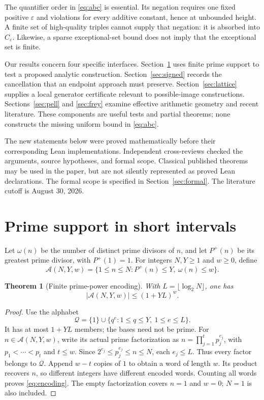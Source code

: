 \documentclass[11pt]{amsart}
\newtheorem{theorem}{Theorem}[section]
\theoremstyle{definition}
\theoremstyle{remark}
\newcommand{\eps}{\varepsilon}
\begin{document}
The quantifier order in \eqref{eq:abc} is essential. Its negation requires
one fixed positive $\eps$ and violations for every additive constant, hence
at unbounded height. A finite set of high-quality triples cannot supply that
negation: it is absorbed into $C_\eps$. Likewise, a sparse exceptional-set
bound does not imply that the exceptional set is finite.

Our results concern four specific interfaces. Section~\ref{sec:smooth}
uses finite prime support to test a proposed analytic construction.
Section~\ref{sec:signed} records the cancellation that an endpoint approach
must preserve. Section~\ref{sec:lattice} supplies a local generator
certificate relevant to possible-image constructions. Sections~\ref{sec:pell}
and \ref{sec:frey} examine effective arithmetic geometry and recent
literature. These components are useful tests and partial theorems; none
constructs the missing uniform bound in \eqref{eq:abc}.

The new statements below were proved mathematically before their
corresponding Lean implementations. Independent cross-reviews checked the
arguments, source hypotheses, and formal scope. Classical published
theorems may be used in the paper, but are not silently represented as
proved Lean declarations. The formal scope is specified in
Section~\ref{sec:formal}. The literature cutoff is August 30, 2026.

\section{Prime support in short intervals}\label{sec:smooth}

Let $\omega(n)$ be the number of distinct prime divisors of $n$, and let
$P^+(n)$ be its greatest prime divisor, with $P^+(1)=1$.
For integers $N,Y\ge1$ and $w\ge0$, define
\[
 \mathcal A(N,Y,w)=
 \{1\le n\le N:P^+(n)\le Y,\ \omega(n)\le w\}.
\]

\begin{theorem}[Finite prime-power encoding]\label{thm:encoding}
With $L=\lfloor\log_2N\rfloor$, one has
\begin{equation}\label{eq:encoding}
 |\mathcal A(N,Y,w)|\le(1+YL)^w.
\end{equation}
\end{theorem}
\begin{proof}
Use the alphabet
\[
 \mathcal Q=\{1\}\cup\{q^e:1\le q\le Y,\ 1\le e\le L\}.
\]
It has at most $1+YL$ members; the bases need not be prime.
For $n\in\mathcal A(N,Y,w)$, write its actual prime factorization as
$n=\prod_{j=1}^t p_j^{e_j}$, with $p_1<\cdots<p_t$ and $t\le w$.
Since $2^{e_j}\le p_j^{e_j}\le n\le N$, each $e_j\le L$.
Thus every factor belongs to $\mathcal Q$. Append $w-t$ copies of $1$ to
obtain a word of length $w$. Its product recovers $n$, so different integers
have different encoded words. Counting all words proves \eqref{eq:encoding}.
The empty factorization covers $n=1$ and $w=0$; $N=1$ is also included.
\end{proof}
\end{document}
